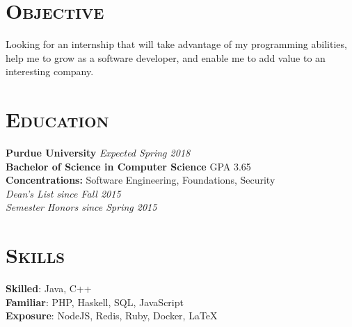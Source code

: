 
\hypersetup{backref,pdfpagemode=Full,colorlinks=true,backref}

\addtolength{\oddsidemargin}{-0.45in}
\addtolength{\voffset}{-0.20in}
\addtolength{\textwidth}{0.85in} 
\addtolength{\textheight}{1.00in}

\renewcommand{\namefont}{\LARGE\emph}




\address{ryndvs96@gmail.com \ \ \ \ \ github.com/ryndvs96}
\begin{resume}


\section{\textsc{Objective}}

Looking for an internship that will take advantage of my programming abilities, help me to grow as a software developer, and enable me to add value to an interesting company.


\section{\textsc{Education}}

\textbf{Purdue University} \hfill \emph{Expected Spring 2018} \\
\textbf{Bachelor of Science in Computer Science} \hfill GPA 3.65\\
\textbf{Concentrations:} Software Engineering, Foundations, Security\\
\emph{Dean's List since Fall 2015}\\
\emph{Semester Honors since Spring 2015}



\section{\textsc{Skills}}

\small{\textbf{Skilled}: }\normalsize{Java, C++}\\
\small{\textbf{Familiar}: }\normalsize{PHP, Haskell, SQL, JavaScript}\\
\small{\textbf{Exposure}: }\normalsize{NodeJS, Redis, Ruby, Docker, \LaTeX}


\end{resume}
